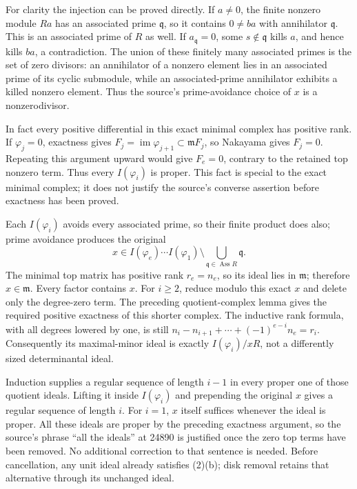 For clarity the injection can be proved directly. If \(a\ne0\), the finite nonzero module \(Ra\) has an associated prime \(\mathfrak q\), so it contains \(0\ne ba\) with annihilator \(\mathfrak q\). This is an associated prime of \(R\) as well. If \(a_{\mathfrak q}=0\), some \(s\notin\mathfrak q\) kills \(a\), and hence kills \(ba\), a contradiction. The union of these finitely many associated primes is the set of zero divisors: an annihilator of a nonzero element lies in an associated prime of its cyclic submodule, while an associated-prime annihilator exhibits a killed nonzero element. Thus the source's prime-avoidance choice of \(x\) is a nonzerodivisor.

In fact every positive differential in this exact minimal complex has positive rank. If \(\varphi_j=0\), exactness gives \(F_j=\operatorname{im}\varphi_{j+1}\subset\mathfrak mF_j\), so Nakayama gives \(F_j=0\). Repeating this argument upward would give \(F_e=0\), contrary to the retained top nonzero term. Thus every \(I(\varphi_i)\) is proper. This fact is special to the exact minimal complex; it does not justify the source's converse assertion before exactness has been proved.

Each \(I(\varphi_i)\) avoids every associated prime, so their finite product does also; prime avoidance produces the original \[
 x\in I(\varphi_e)\cdots I(\varphi_1)
       \setminus\bigcup_{\mathfrak q\in\operatorname{Ass}R}\mathfrak q .
\] The minimal top matrix has positive rank \(r_e=n_e\), so its ideal lies in \(\mathfrak m\); therefore \(x\in\mathfrak m\). Every factor contains \(x\). For \(i\ge2\), reduce modulo this exact \(x\) and delete only the degree-zero term. The preceding quotient-complex lemma gives the required positive exactness of this shorter complex. The inductive rank formula, with all degrees lowered by one, is still \(n_i-n_{i+1}+\cdots+(-1)^{e-i}n_e=r_i\). Consequently its maximal-minor ideal is exactly \(I(\varphi_i)/xR\), not a differently sized determinantal ideal.

Induction supplies a regular sequence of length \(i-1\) in every proper one of those quotient ideals. Lifting it inside \(I(\varphi_i)\) and prepending the original \(x\) gives a regular sequence of length \(i\). For \(i=1\), \(x\) itself suffices whenever the ideal is proper. All these ideals are proper by the preceding exactness argument, so the source's phrase ``all the ideals'' at 24890 is justified once the zero top terms have been removed. No additional correction to that sentence is needed. Before cancellation, any unit ideal already satisfies (2)(b); disk removal retains that alternative through its unchanged ideal.

